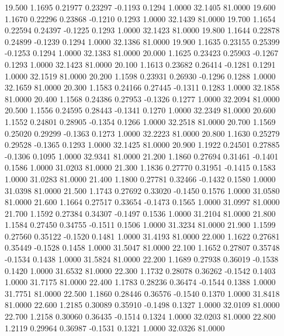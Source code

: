   19.500   1.1695   0.21977   0.23297  -0.1193   0.1294   1.0000  32.1405  81.0000
  19.600   1.1670   0.22296   0.23868  -0.1210   0.1293   1.0000  32.1439  81.0000
  19.700   1.1654   0.22594   0.24397  -0.1225   0.1293   1.0000  32.1423  81.0000
  19.800   1.1644   0.22878   0.24899  -0.1239   0.1294   1.0000  32.1386  81.0000
  19.900   1.1635   0.23155   0.25399  -0.1253   0.1294   1.0000  32.1383  81.0000
  20.000   1.1625   0.23423   0.25903  -0.1267   0.1293   1.0000  32.1423  81.0000
  20.100   1.1613   0.23682   0.26414  -0.1281   0.1291   1.0000  32.1519  81.0000
  20.200   1.1598   0.23931   0.26930  -0.1296   0.1288   1.0000  32.1659  81.0000
  20.300   1.1583   0.24166   0.27445  -0.1311   0.1283   1.0000  32.1858  81.0000
  20.400   1.1568   0.24386   0.27953  -0.1326   0.1277   1.0000  32.2094  81.0000
  20.500   1.1556   0.24595   0.28443  -0.1341   0.1270   1.0000  32.2349  81.0000
  20.600   1.1552   0.24801   0.28905  -0.1354   0.1266   1.0000  32.2518  81.0000
  20.700   1.1569   0.25020   0.29299  -0.1363   0.1273   1.0000  32.2223  81.0000
  20.800   1.1630   0.25279   0.29528  -0.1365   0.1293   1.0000  32.1425  81.0000
  20.900   1.1922   0.24501   0.27885  -0.1306   0.1095   1.0000  32.9341  81.0000
  21.200   1.1860   0.27694   0.31461  -0.1401   0.1586   1.0000  31.0203  81.0000
  21.300   1.1836   0.27770   0.31951  -0.1415   0.1583   1.0000  31.0283  81.0000
  21.400   1.1800   0.27781   0.32466  -0.1432   0.1580   1.0000  31.0398  81.0000
  21.500   1.1743   0.27692   0.33020  -0.1450   0.1576   1.0000  31.0580  81.0000
  21.600   1.1664   0.27517   0.33654  -0.1473   0.1565   1.0000  31.0997  81.0000
  21.700   1.1592   0.27384   0.34307  -0.1497   0.1536   1.0000  31.2104  81.0000
  21.800   1.1584   0.27450   0.34755  -0.1511   0.1506   1.0000  31.3234  81.0000
  21.900   1.1599   0.27560   0.35122  -0.1520   0.1481   1.0000  31.4193  81.0000
  22.000   1.1622   0.27681   0.35449  -0.1528   0.1458   1.0000  31.5047  81.0000
  22.100   1.1652   0.27807   0.35748  -0.1534   0.1438   1.0000  31.5824  81.0000
  22.200   1.1689   0.27938   0.36019  -0.1538   0.1420   1.0000  31.6532  81.0000
  22.300   1.1732   0.28078   0.36262  -0.1542   0.1403   1.0000  31.7175  81.0000
  22.400   1.1783   0.28236   0.36474  -0.1544   0.1388   1.0000  31.7751  81.0000
  22.500   1.1860   0.28446   0.36576  -0.1540   0.1370   1.0000  31.8418  81.0000
  22.600   1.2185   0.30089   0.35910  -0.1498   0.1327   1.0000  32.0109  81.0000
  22.700   1.2158   0.30060   0.36435  -0.1514   0.1324   1.0000  32.0203  81.0000
  22.800   1.2119   0.29964   0.36987  -0.1531   0.1321   1.0000  32.0326  81.0000
